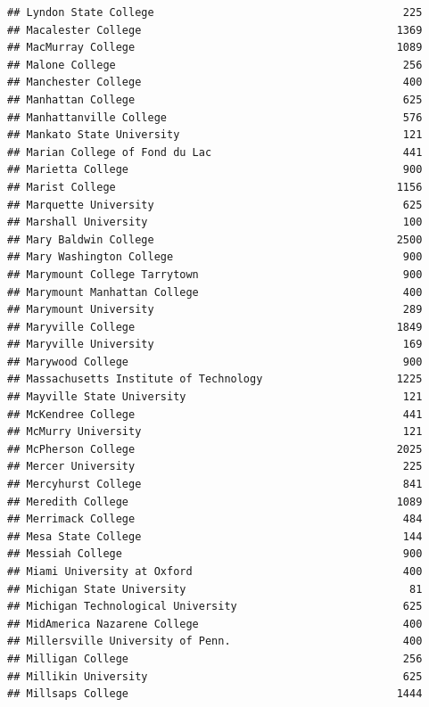\documentclass[
]{article}
\begin{document}
\begin{verbatim}
## Lyndon State College                                       225
## Macalester College                                        1369
## MacMurray College                                         1089
## Malone College                                             256
## Manchester College                                         400
## Manhattan College                                          625
## Manhattanville College                                     576
## Mankato State University                                   121
## Marian College of Fond du Lac                              441
## Marietta College                                           900
## Marist College                                            1156
## Marquette University                                       625
## Marshall University                                        100
## Mary Baldwin College                                      2500
## Mary Washington College                                    900
## Marymount College Tarrytown                                900
## Marymount Manhattan College                                400
## Marymount University                                       289
## Maryville College                                         1849
## Maryville University                                       169
## Marywood College                                           900
## Massachusetts Institute of Technology                     1225
## Mayville State University                                  121
## McKendree College                                          441
## McMurry University                                         121
## McPherson College                                         2025
## Mercer University                                          225
## Mercyhurst College                                         841
## Meredith College                                          1089
## Merrimack College                                          484
## Mesa State College                                         144
## Messiah College                                            900
## Miami University at Oxford                                 400
## Michigan State University                                   81
## Michigan Technological University                          625
## MidAmerica Nazarene College                                400
## Millersville University of Penn.                           400
## Milligan College                                           256
## Millikin University                                        625
## Millsaps College                                          1444

\end{verbatim}
\end{document}
